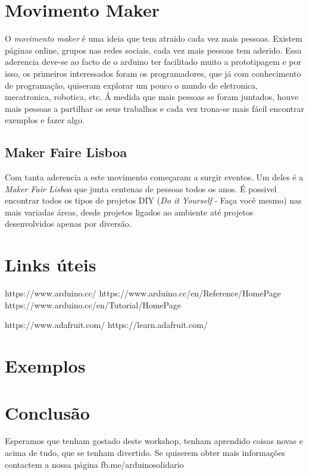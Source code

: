 ﻿\documentclass{article}
\begin{document}
\section{Movimento Maker}
O \textit{movimento maker} é uma ideia que tem atraido cada vez mais pessoas. Existem páginas online, grupos nas redes sociais, cada vez mais pessoas tem aderido. Essa aderencia deve-se ao facto de o arduino ter facilitado muito a prototipagem e por isso, os primeiros interessados foram os programadores, que já com conhecimento de programação, quiseram explorar um pouco o mundo de eletronica, mecatronica, robotica, etc.\newline
Á medida que mais pessoas se foram juntados, houve mais pessoas a partilhar os seus trabalhos e cada vez trona-se mais fácil encontrar exemplos e fazer algo.

\subsection{Maker Faire Lisboa}
Com tanta aderencia a este movimento começaram a surgir eventos. Um deles é a \textit{Maker Fair Lisboa} que junta centenas de pessoas todos os anos. É possivel encontrar todos os tipos de projetos DIY (\textit{Do it Yourself} - Faça você mesmo) nas mais variadas áreas, desde projetos ligados ao ambiente até projetos desenvolvidos apenas por diversão.

\section{Links úteis}
https://www.arduino.cc/
https://www.arduino.cc/en/Reference/HomePage
https://www.arduino.cc/en/Tutorial/HomePage

https://www.adafruit.com/
https://learn.adafruit.com/


\section{Exemplos}

\section{Conclusão}
Esperamos que tenham gostado deste workshop, tenham aprendido coisas novas e acima de tudo, que se tenham divertido.
Se quiserem obter mais informações contactem a nossa página fb.me/arduinosolidario
\end{document}
